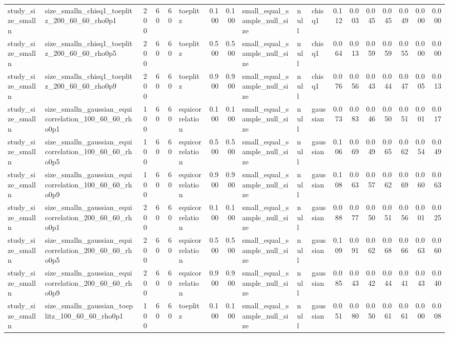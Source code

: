 \begin{tabular}{llrrrlrrlllrrrrrrr}
study\_size\_smalln & size\_smalln\_chisq1\_toeplitz\_200\_60\_60\_rho0p1 & 200 & 60 & 60 & toeplitz & 0.100 & 0.100 & small\_equal\_sample\_null\_size & null & chisq1 & 0.112 & 0.003 & 0.045 & 0.045 & 0.049 & 0.000 & 0.000 \\
study\_size\_smalln & size\_smalln\_chisq1\_toeplitz\_200\_60\_60\_rho0p5 & 200 & 60 & 60 & toeplitz & 0.500 & 0.500 & small\_equal\_sample\_null\_size & null & chisq1 & 0.064 & 0.013 & 0.059 & 0.059 & 0.055 & 0.000 & 0.000 \\
study\_size\_smalln & size\_smalln\_chisq1\_toeplitz\_200\_60\_60\_rho0p9 & 200 & 60 & 60 & toeplitz & 0.900 & 0.900 & small\_equal\_sample\_null\_size & null & chisq1 & 0.076 & 0.056 & 0.043 & 0.044 & 0.047 & 0.005 & 0.013 \\
study\_size\_smalln & size\_smalln\_gaussian\_equicorrelation\_100\_60\_60\_rho0p1 & 100 & 60 & 60 & equicorrelation & 0.100 & 0.100 & small\_equal\_sample\_null\_size & null & gaussian & 0.073 & 0.083 & 0.046 & 0.050 & 0.051 & 0.001 & 0.017 \\
study\_size\_smalln & size\_smalln\_gaussian\_equicorrelation\_100\_60\_60\_rho0p5 & 100 & 60 & 60 & equicorrelation & 0.500 & 0.500 & small\_equal\_sample\_null\_size & null & gaussian & 0.106 & 0.069 & 0.049 & 0.065 & 0.062 & 0.054 & 0.049 \\
study\_size\_smalln & size\_smalln\_gaussian\_equicorrelation\_100\_60\_60\_rho0p9 & 100 & 60 & 60 & equicorrelation & 0.900 & 0.900 & small\_equal\_sample\_null\_size & null & gaussian & 0.108 & 0.063 & 0.057 & 0.062 & 0.069 & 0.060 & 0.063 \\
study\_size\_smalln & size\_smalln\_gaussian\_equicorrelation\_200\_60\_60\_rho0p1 & 200 & 60 & 60 & equicorrelation & 0.100 & 0.100 & small\_equal\_sample\_null\_size & null & gaussian & 0.088 & 0.077 & 0.050 & 0.051 & 0.056 & 0.001 & 0.025 \\
study\_size\_smalln & size\_smalln\_gaussian\_equicorrelation\_200\_60\_60\_rho0p5 & 200 & 60 & 60 & equicorrelation & 0.500 & 0.500 & small\_equal\_sample\_null\_size & null & gaussian & 0.109 & 0.091 & 0.062 & 0.068 & 0.066 & 0.063 & 0.060 \\
study\_size\_smalln & size\_smalln\_gaussian\_equicorrelation\_200\_60\_60\_rho0p9 & 200 & 60 & 60 & equicorrelation & 0.900 & 0.900 & small\_equal\_sample\_null\_size & null & gaussian & 0.085 & 0.043 & 0.042 & 0.044 & 0.041 & 0.043 & 0.040 \\
study\_size\_smalln & size\_smalln\_gaussian\_toeplitz\_100\_60\_60\_rho0p1 & 100 & 60 & 60 & toeplitz & 0.100 & 0.100 & small\_equal\_sample\_null\_size & null & gaussian & 0.051 & 0.080 & 0.050 & 0.061 & 0.061 & 0.000 & 0.008 \\

\end{tabular}
